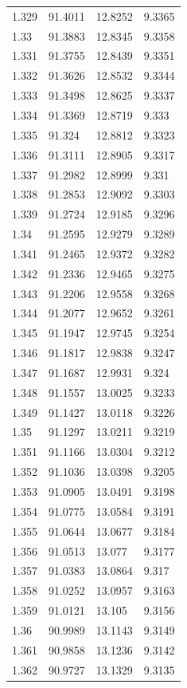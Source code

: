 \begin{tabular}{llll}
1.329 & 91.4011 & 12.8252 & 9.3365 \\
1.33 & 91.3883 & 12.8345 & 9.3358 \\
1.331 & 91.3755 & 12.8439 & 9.3351 \\
1.332 & 91.3626 & 12.8532 & 9.3344 \\
1.333 & 91.3498 & 12.8625 & 9.3337 \\
1.334 & 91.3369 & 12.8719 & 9.333 \\
1.335 & 91.324 & 12.8812 & 9.3323 \\
1.336 & 91.3111 & 12.8905 & 9.3317 \\
1.337 & 91.2982 & 12.8999 & 9.331 \\
1.338 & 91.2853 & 12.9092 & 9.3303 \\
1.339 & 91.2724 & 12.9185 & 9.3296 \\
1.34 & 91.2595 & 12.9279 & 9.3289 \\
1.341 & 91.2465 & 12.9372 & 9.3282 \\
1.342 & 91.2336 & 12.9465 & 9.3275 \\
1.343 & 91.2206 & 12.9558 & 9.3268 \\
1.344 & 91.2077 & 12.9652 & 9.3261 \\
1.345 & 91.1947 & 12.9745 & 9.3254 \\
1.346 & 91.1817 & 12.9838 & 9.3247 \\
1.347 & 91.1687 & 12.9931 & 9.324 \\
1.348 & 91.1557 & 13.0025 & 9.3233 \\
1.349 & 91.1427 & 13.0118 & 9.3226 \\
1.35 & 91.1297 & 13.0211 & 9.3219 \\
1.351 & 91.1166 & 13.0304 & 9.3212 \\
1.352 & 91.1036 & 13.0398 & 9.3205 \\
1.353 & 91.0905 & 13.0491 & 9.3198 \\
1.354 & 91.0775 & 13.0584 & 9.3191 \\
1.355 & 91.0644 & 13.0677 & 9.3184 \\
1.356 & 91.0513 & 13.077 & 9.3177 \\
1.357 & 91.0383 & 13.0864 & 9.317 \\
1.358 & 91.0252 & 13.0957 & 9.3163 \\
1.359 & 91.0121 & 13.105 & 9.3156 \\
1.36 & 90.9989 & 13.1143 & 9.3149 \\
1.361 & 90.9858 & 13.1236 & 9.3142 \\
1.362 & 90.9727 & 13.1329 & 9.3135 \\

\end{tabular}
